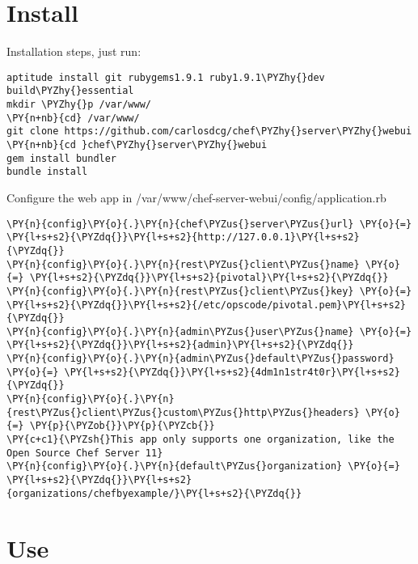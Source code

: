 \section{Install}

Installation steps, just run:
\begin{codelisting}
\label{code:}
\codecaption{}
\begin{Verbatim}[fontsize=\relsize{-2.5},fontseries=b,commandchars=\\\{\}]
aptitude install git rubygems1.9.1 ruby1.9.1\PYZhy{}dev build\PYZhy{}essential
mkdir \PYZhy{}p /var/www/
\PY{n+nb}{cd} /var/www/
git clone https://github.com/carlosdcg/chef\PYZhy{}server\PYZhy{}webui
\PY{n+nb}{cd }chef\PYZhy{}server\PYZhy{}webui
gem install bundler
bundle install
\end{Verbatim}
\end{codelisting}

Configure the web app in /var/www/chef-server-webui/config/application.rb

\begin{codelisting}
\label{code:}
\codecaption{}
\begin{Verbatim}[fontsize=\relsize{-2.5},fontseries=b,commandchars=\\\{\}]
\PY{n}{config}\PY{o}{.}\PY{n}{chef\PYZus{}server\PYZus{}url} \PY{o}{=} \PY{l+s+s2}{\PYZdq{}}\PY{l+s+s2}{http://127.0.0.1}\PY{l+s+s2}{\PYZdq{}}
\PY{n}{config}\PY{o}{.}\PY{n}{rest\PYZus{}client\PYZus{}name} \PY{o}{=} \PY{l+s+s2}{\PYZdq{}}\PY{l+s+s2}{pivotal}\PY{l+s+s2}{\PYZdq{}}
\PY{n}{config}\PY{o}{.}\PY{n}{rest\PYZus{}client\PYZus{}key} \PY{o}{=} \PY{l+s+s2}{\PYZdq{}}\PY{l+s+s2}{/etc/opscode/pivotal.pem}\PY{l+s+s2}{\PYZdq{}}
\PY{n}{config}\PY{o}{.}\PY{n}{admin\PYZus{}user\PYZus{}name} \PY{o}{=}  \PY{l+s+s2}{\PYZdq{}}\PY{l+s+s2}{admin}\PY{l+s+s2}{\PYZdq{}}
\PY{n}{config}\PY{o}{.}\PY{n}{admin\PYZus{}default\PYZus{}password} \PY{o}{=} \PY{l+s+s2}{\PYZdq{}}\PY{l+s+s2}{4dm1n1str4t0r}\PY{l+s+s2}{\PYZdq{}}
\PY{n}{config}\PY{o}{.}\PY{n}{rest\PYZus{}client\PYZus{}custom\PYZus{}http\PYZus{}headers} \PY{o}{=} \PY{p}{\PYZob{}}\PY{p}{\PYZcb{}}
\PY{c+c1}{\PYZsh{}This app only supports one organization, like the Open Source Chef Server 11}
\PY{n}{config}\PY{o}{.}\PY{n}{default\PYZus{}organization} \PY{o}{=} \PY{l+s+s2}{\PYZdq{}}\PY{l+s+s2}{organizations/chefbyexample/}\PY{l+s+s2}{\PYZdq{}}
\end{Verbatim}
\end{codelisting}

\section{Use}

